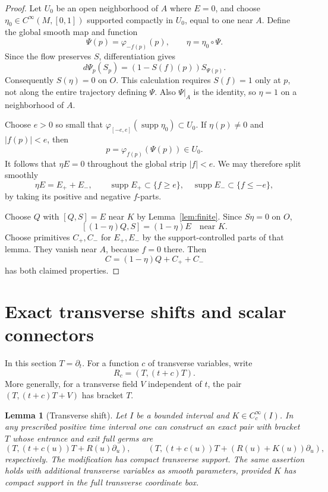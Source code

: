 \documentclass[11pt]{article}
\newtheorem{lemma}[theorem]{Lemma}
\theoremstyle{remark}
\begin{document}
\begin{proof}
Let $U_0$ be an open neighborhood of $A$ where $E=0$, and choose $\eta_0\in C^\infty(M,[0,1])$ supported compactly in $U_0$, equal to one near $A$. Define the global smooth map and function
$$
 \Psi(p)=\varphi_{-f(p)}(p),\qquad \eta=\eta_0\circ\Psi.
$$
Since the flow preserves $S$, differentiation gives
$$
 d\Psi_p(S_p)=(1-S(f)(p))S_{\Psi(p)}.
$$
Consequently $S(\eta)=0$ on $O$. This calculation requires $S(f)=1$ only at $p$, not along the entire trajectory defining $\Psi$. Also $\Psi|_A$ is the identity, so $\eta=1$ on a neighborhood of $A$.

Choose $e>0$ so small that $\varphi_{[-e,e]}(\operatorname{supp}\eta_0)\subset U_0$. If $\eta(p)\ne0$ and $|f(p)|<e$, then
$$
 p=\varphi_{f(p)}(\Psi(p))\in U_0.
$$
It follows that $\eta E=0$ throughout the global strip $|f|<e$.
We may therefore split smoothly
$$
 \eta E=E_++E_-,\qquad
 \operatorname{supp}E_+\subset\{f\ge e\},\quad
 \operatorname{supp}E_-\subset\{f\le-e\},
$$
by taking its positive and negative $f$-parts.

Choose $Q$ with $[Q,S]=E$ near $K$ by Lemma~\ref{lem:finite}. Since
$S\eta=0$ on $O$,
$$
 [(1-\eta)Q,S]=(1-\eta)E\quad\text{near }K.
$$
Choose primitives $C_+,C_-$ for $E_+,E_-$ by the support-controlled parts of that lemma. They vanish near $A$, because $f=0$ there. Then
$$
 C=(1-\eta)Q+C_++C_-
$$
has both claimed properties.
\end{proof}

\section{Exact transverse shifts and scalar connectors}\label{sec:scalar}

In this section $T=\partial_t$. For a function $c$ of transverse variables,
write
$$
 R_c=(T,(t+c)T).
$$
More generally, for a transverse field $V$ independent of $t$,
the pair $(T,(t+c)T+V)$ has bracket $T$.

\begin{lemma}[Transverse shift]\label{lem:kick}
Let $I$ be a bounded interval and $K\in C_c^\infty(I)$. In any prescribed positive time interval one can construct an exact pair with bracket $T$ whose entrance and exit full germs are
$$
 (T,(t+c(u))T+R(u)\partial_u),\qquad
 (T,(t+c(u))T+(R(u)+K(u))\partial_u),
$$
respectively. The modification has compact transverse support. The same assertion holds with additional transverse variables as smooth parameters, provided $K$ has compact support in the full transverse coordinate box.
\end{lemma}
\end{document}
